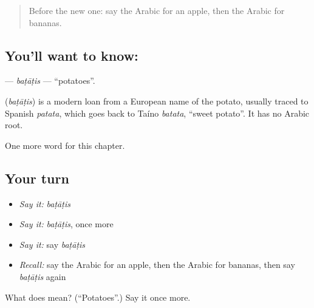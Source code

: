 \label{lesson:AR-C66-batatis}



\begin{quote}
Before the new one: say the Arabic for an apple, then the Arabic for bananas.
\end{quote}

\subsection*{You'll want to know: }
\textbf{} — \emph{baṭāṭis} — \textquotedblleft{}potatoes\textquotedblright{}.

\begin{cousinweb}
\textbf{} (\emph{baṭāṭis}) is a modern loan from a European name of the potato, usually traced to Spanish \emph{patata}, which goes back to Taíno \emph{batata}, \textquotedblleft{}sweet potato\textquotedblright{}. It has no Arabic root.
\end{cousinweb}

\begin{grammarlens}[title={What you've built}]
One more word for this chapter.
\end{grammarlens}

\subsection*{Your turn}
\begin{itemize}
\raggedright
  \item \emph{Say it:} \emph{baṭāṭis}
  \item \emph{Say it:} \emph{baṭāṭis}, once more
  \item \emph{Say it:} say \emph{baṭāṭis}
  \item \emph{Recall:} say the Arabic for an apple, then the Arabic for bananas, then say \emph{baṭāṭis} again
\end{itemize}

\begin{tcolorbox}[breakable,colback=teal!4,colframe=teal!35!black,title={Before you move on}]
What does  mean? (\textquotedblleft{}Potatoes\textquotedblright{}.) Say it once more.
\end{tcolorbox}
